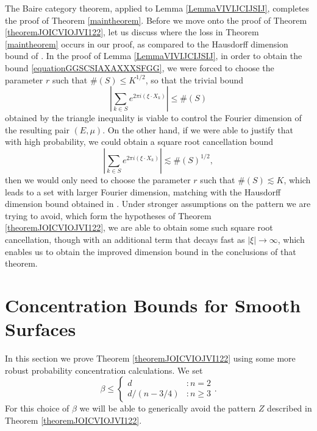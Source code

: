 \documentclass[dvipsnames,letterpaper,12pt]{article}
\numberwithin{equation}{section}
\numberwithin{theorem}{section}
\begin{document}
The Baire category theorem, applied to Lemma \ref{LemmaVIVIJCIJSIJ}, completes the proof of Theorem \ref{maintheorem}. Before we move onto the proof of Theorem \ref{theoremJOICVIOJVI122}, let us discuss where the loss in Theorem \ref{maintheorem} occurs in our proof, as compared to the Hausdorff dimension bound of \cite{OurPaper}. In the proof of Lemma \ref{LemmaVIVIJCIJSIJ}, in order to obtain the bound \eqref{equationGGSCSIAXAXXXSFGG}, we were forced to choose the parameter $r$ such that $\#(S) \leq K^{1/2}$, so that the trivial bound
%
\begin{equation}
    \left| \sum_{k \in S} e^{2 \pi i (\xi \cdot X_k)} \right| \leq \#(S)
\end{equation}
%
obtained by the triangle inequality is viable to control the Fourier dimension of the resulting pair $(E,\mu)$. On the other hand, if we were able to justify that with high probability, we could obtain a square root cancellation bound
%
\begin{equation}
    \left| \sum_{k \in S} e^{2 \pi i (\xi \cdot X_k)} \right| \lesssim \#(S)^{1/2},
\end{equation}
%
then we would only need to choose the parameter $r$ such that $\#(S) \lesssim K$, which leads to a set with larger Fourier dimension, matching with the Hausdorff dimension bound obtained in \cite{OurPaper}. Under stronger assumptions on the pattern we are trying to avoid, which form the hypotheses of Theorem \ref{theoremJOICVIOJVI122}, we are able to obtain some such square root cancellation, though with an additional term that decays fast as $|\xi| \to \infty$, which enables us to obtain the improved dimension bound in the conclusions of that theorem.

\section{Concentration Bounds for Smooth Surfaces}

In this section we prove Theorem \ref{theoremJOICVIOJVI122} using some more robust probability concentration calculations. We set
%
\[ \beta \leq \begin{cases} d &: n = 2 \\ d/(n - 3/4) &: n \geq 3 \end{cases}. \]
%
For this choice of $\beta$ we will be able to generically avoid the pattern $Z$ described in Theorem \ref{theoremJOICVIOJVI122}.
\end{document}
